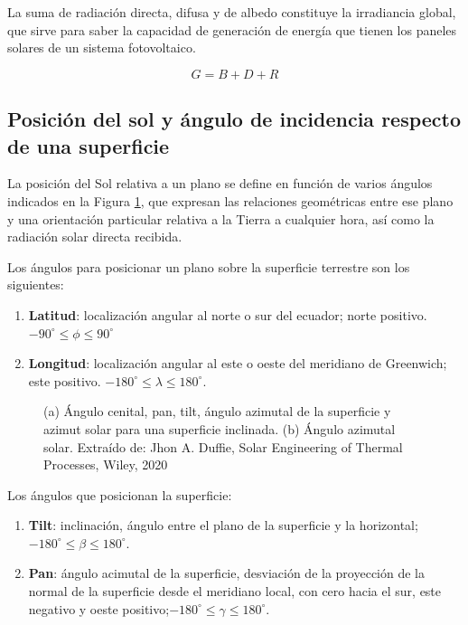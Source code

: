La suma de radiación directa, difusa y de albedo constituye la irradiancia global, que sirve para saber la capacidad de generación de energía que tienen los paneles solares de un sistema fotovoltaico.

\begin{equation}
    G = B + D + R
\end{equation}

\subsection{Posición del sol y ángulo de incidencia respecto de una superficie}
La posición del Sol relativa a un plano se define en función de varios ángulos indicados en la Figura \ref{fig:solar_ang}, que expresan las relaciones geométricas entre ese plano y una orientación particular relativa a la Tierra a cualquier hora, así como la radiación solar directa recibida.

Los ángulos para posicionar un plano sobre la superficie terrestre son los siguientes:


\begin{enumerate}
    \item[$\phi$]\textbf{Latitud}: localización angular al norte o sur del ecuador; norte positivo. \(-90^\circ \leq {\phi} \leq 90^\circ \)
    \item[$\lambda$] \textbf{Longitud}: localización angular al este o oeste del meridiano de Greenwich; este positivo. \( -180^\circ \leq \lambda \leq 180^\circ \).

\end{enumerate}

\begin{figure}[tb]
    \centering
    \subfloat[]{}
    \subfloat[]{}
    \caption{(a) Ángulo cenital, pan, tilt, ángulo azimutal de la superficie y azimut solar para una superficie inclinada. (b) Ángulo azimutal solar. Extraído de: Jhon A. Duffie, Solar Engineering of Thermal Processes, Wiley, 2020}
    \label{fig:solar_ang}
\end{figure}

Los ángulos que posicionan la superficie:
\begin{enumerate}
    \item[$\beta$]\textbf{Tilt}: inclinación, ángulo entre el plano de la superficie y la horizontal;\( -180^\circ \leq \beta \leq 180^\circ \).  \item[$\gamma$]\textbf{Pan}: ángulo acimutal de la superficie, desviación de la proyección de la normal de la superficie desde el meridiano local, con cero hacia el sur, este negativo y oeste positivo;\( -180^\circ \leq \gamma \leq 180^\circ \). 
\end{enumerate}


